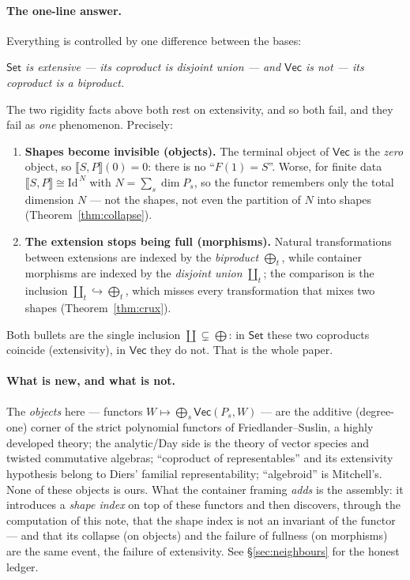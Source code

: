 \documentclass[11pt]{amsart}
\theoremstyle{plain}
\theoremstyle{definition}
\renewcommand{\Vec}{\mathsf{Vec}}
\newcommand{\Set}{\mathsf{Set}}
\newcommand{\Id}{\mathrm{Id}}
\newcommand{\ext}[1]{\llbracket #1 \rrbracket}
\newcommand{\iso}{\cong}
\DeclareMathOperator{\dcoprod}{\textstyle\coprod}
\begin{document}
\paragraph{The one-line answer.}
Everything is controlled by one difference between the bases:
\begin{center}\itshape
$\Set$ is extensive --- its coproduct is disjoint union --- and $\Vec$ is not
--- its coproduct is a biproduct.
\end{center}
The two rigidity facts above both rest on extensivity, and so both fail, and
they fail as \emph{one} phenomenon. Precisely:
\begin{enumerate}[label=(\alph*)]
\item \textbf{Shapes become invisible (objects).} The terminal object of
  $\Vec$ is the \emph{zero} object, so $\ext{S,P}(0)=0$: there is no ``$F(1)=S$''.
  Worse, for finite data $\ext{S,P} \iso \Id^{\,N}$ with $N=\sum_s \dim P_s$,
  so the functor remembers only the total dimension $N$ --- not the shapes, not
  even the partition of $N$ into shapes (Theorem~\ref{thm:collapse}).
\item \textbf{The extension stops being full (morphisms).} Natural
  transformations between extensions are indexed by the \emph{biproduct}
  $\bigoplus_t$, while container morphisms are indexed by the \emph{disjoint
  union} $\dcoprod_t$; the comparison is the inclusion
  $\dcoprod_t \hookrightarrow \bigoplus_t$, which misses every transformation
  that mixes two shapes (Theorem~\ref{thm:crux}).
\end{enumerate}
Both bullets are the single inclusion $\dcoprod \subsetneq \bigoplus$: in
$\Set$ these two coproducts coincide (extensivity), in $\Vec$ they do not.
That is the whole paper.

\paragraph{What is new, and what is not.}
The \emph{objects} here --- functors $W \mapsto \bigoplus_s \Vec(P_s,W)$ ---
are the additive (degree-one) corner of the strict polynomial functors of
Friedlander--Suslin, a highly developed theory; the analytic/Day side is the
theory of vector species and twisted commutative algebras; ``coproduct of
representables'' and its extensivity hypothesis belong to Diers' familial
representability; ``algebroid'' is Mitchell's. None of these objects is ours.
What the container framing \emph{adds} is the assembly: it introduces a
\emph{shape index} on top of these functors and then discovers, through the
computation of this note, that the shape index is not an invariant of the
functor --- and that its collapse (on objects) and the failure of fullness (on
morphisms) are the same event, the failure of extensivity. See
\S\ref{sec:neighbours} for the honest ledger.
\end{document}
